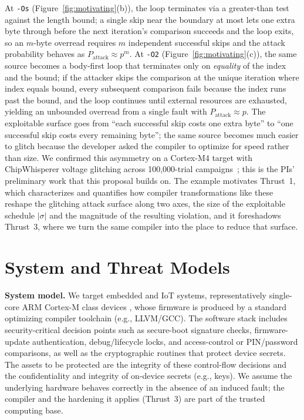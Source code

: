 At \texttt{-Os} (Figure~\ref{fig:motivating}(b)), the loop terminates via a greater-than test against the length bound; a single skip near the boundary at most lets one extra byte through before the next iteration's comparison succeeds and the loop exits, so an $m$-byte overread requires $m$ independent successful skips and the attack probability behaves as $P_{\text{attack}}\!\approx\! p^m$.
At \texttt{-O2} (Figure~\ref{fig:motivating}(c)), the same source becomes a body-first loop that terminates only on \emph{equality} of the index and the bound; if the attacker skips the comparison at the unique iteration where index equals bound, every subsequent comparison fails because the index runs past the bound, and the loop continues until external resources are exhausted, yielding an unbounded overread from a single fault with $P_{\text{attack}}\!\approx\! p$.
The exploitable surface goes from ``each successful skip costs one extra byte'' to ``one successful skip costs every remaining byte''; the same source becomes much easier to glitch because the developer asked the compiler to optimize for speed rather than size.
We confirmed this asymmetry on a Cortex-M4 target with ChipWhisperer voltage glitching across 100{,}000-trial campaigns~; this is the PIs' preliminary work that this proposal builds on.
The example motivates Thrust~1, which characterizes and quantifies how compiler transformations like these reshape the glitching attack surface along two axes, the size of the exploitable schedule $|\sigma|$ and the magnitude of the resulting violation, and it foreshadows Thrust~3, where we turn the same compiler into the place to reduce that surface.

\section{System and Threat Models}

\noindent\textbf{System model.}
We target embedded and IoT systems, representatively single-core ARM Cortex-M class devices , whose firmware is produced by a standard optimizing compiler toolchain (e.g., LLVM/GCC).
The software stack includes security-critical decision points such as secure-boot signature checks, firmware-update authentication, debug/lifecycle locks, and access-control or PIN/password comparisons, as well as the cryptographic routines that protect device secrets.
The assets to be protected are the integrity of these control-flow decisions and the confidentiality and integrity of on-device secrets (e.g., keys).
We assume the underlying hardware behaves correctly in the absence of an induced fault; the compiler and the hardening it applies (Thrust~3) are part of the trusted computing base.

